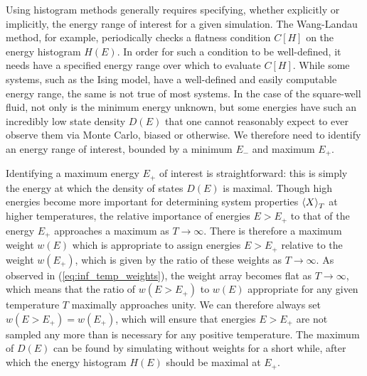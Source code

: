 \documentclass[11pt]{article}
\newcommand{\bk}{\Braket} %
\newcommand{\p}[1]{\left(#1\right)} %
\renewcommand{\sp}[1]{\left[#1\right]} %
\begin{document}
Using histogram methods generally requires specifying, whether
explicitly or implicitly, the energy range of interest for a given
simulation. The Wang-Landau method, for example, periodically checks a
flatness condition $C\sp{H}$ on the energy histogram $H\p{E}$. In
order for such a condition to be well-defined, it needs have a
specified energy range over which to evaluate $C\sp{H}$. While some
systems, such as the Ising model, have a well-defined and easily
computable energy range, the same is not true of most systems. In the
case of the square-well fluid, not only is the minimum energy unknown,
but some energies have such an incredibly low state density $D\p{E}$
that one cannot reasonably expect to ever observe them via Monte
Carlo, biased or otherwise. We therefore need to identify an energy
range of interest, bounded by a minimum $E_-$ and maximum $E_+$.

Identifying a maximum energy $E_+$ of interest is straightforward:
this is simply the energy at which the density of states $D\p{E}$ is
maximal. Though high energies become more important for determining
system properties $\bk{X}_T$ at higher temperatures, the relative
importance of energies $E>E_+$ to that of the energy $E_+$ approaches
a maximum as $T\to\infty$. There is therefore a maximum weight
$w\p{E}$ which is appropriate to assign energies $E>E_+$ relative to
the weight $w\p{E_+}$, which is given by the ratio of these weights as
$T\to\infty$. As observed in (\ref{eq:inf_temp_weights}), the weight
array becomes flat as $T\to\infty$, which means that the ratio of
$w\p{E>E_+}$ to $w\p{E}$ appropriate for any given temperature $T$
maximally approaches unity. We can therefore always set
$w\p{E>E_+}=w\p{E_+}$, which will ensure that energies $E>E_+$ are not
sampled any more than is necessary for any positive temperature. The
maximum of $D\p{E}$ can be found by simulating without weights for a
short while, after which the energy histogram $H\p{E}$ should be
maximal at $E_+$.
\end{document}
